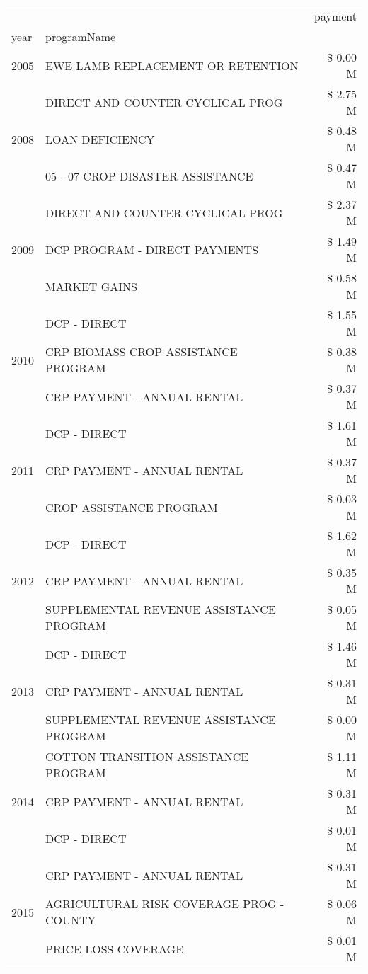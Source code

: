 \begin{tabular}{llr}
\toprule
 &  & payment \\
year & programName &  \\
\midrule
2005 & EWE LAMB REPLACEMENT OR RETENTION & \$ 0.00 M \\
\cline{1-3}
\multirow[t]{3}{*}{2008} & DIRECT AND COUNTER CYCLICAL PROG & \$ 2.75 M \\
 & LOAN DEFICIENCY & \$ 0.48 M \\
 & 05 - 07 CROP DISASTER ASSISTANCE & \$ 0.47 M \\
\cline{1-3}
\multirow[t]{3}{*}{2009} & DIRECT AND COUNTER CYCLICAL PROG & \$ 2.37 M \\
 & DCP PROGRAM - DIRECT PAYMENTS & \$ 1.49 M \\
 & MARKET GAINS & \$ 0.58 M \\
\cline{1-3}
\multirow[t]{3}{*}{2010} & DCP - DIRECT & \$ 1.55 M \\
 & CRP BIOMASS CROP ASSISTANCE PROGRAM & \$ 0.38 M \\
 & CRP PAYMENT - ANNUAL RENTAL & \$ 0.37 M \\
\cline{1-3}
\multirow[t]{3}{*}{2011} & DCP - DIRECT & \$ 1.61 M \\
 & CRP PAYMENT - ANNUAL RENTAL & \$ 0.37 M \\
 & CROP ASSISTANCE PROGRAM & \$ 0.03 M \\
\cline{1-3}
\multirow[t]{3}{*}{2012} & DCP - DIRECT & \$ 1.62 M \\
 & CRP PAYMENT - ANNUAL RENTAL & \$ 0.35 M \\
 & SUPPLEMENTAL REVENUE ASSISTANCE PROGRAM & \$ 0.05 M \\
\cline{1-3}
\multirow[t]{3}{*}{2013} & DCP - DIRECT & \$ 1.46 M \\
 & CRP PAYMENT - ANNUAL RENTAL & \$ 0.31 M \\
 & SUPPLEMENTAL REVENUE ASSISTANCE PROGRAM & \$ 0.00 M \\
\cline{1-3}
\multirow[t]{3}{*}{2014} & COTTON TRANSITION ASSISTANCE PROGRAM & \$ 1.11 M \\
 & CRP PAYMENT - ANNUAL RENTAL & \$ 0.31 M \\
 & DCP - DIRECT & \$ 0.01 M \\
\cline{1-3}
\multirow[t]{3}{*}{2015} & CRP PAYMENT - ANNUAL RENTAL & \$ 0.31 M \\
 & AGRICULTURAL RISK COVERAGE PROG - COUNTY & \$ 0.06 M \\
 & PRICE LOSS COVERAGE & \$ 0.01 M \\

\end{tabular}
